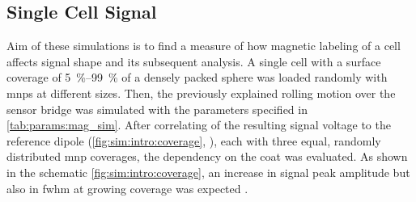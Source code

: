 \subsection{Single Cell Signal}
Aim of these simulations is to find a measure of how magnetic labeling of a cell affects signal shape and its subsequent analysis. A single cell with a surface coverage of \SIrange{5}{99}{\percent} of a densely packed sphere was loaded randomly with \glspl{mnp} at different sizes. Then, the previously explained rolling motion over the sensor bridge was simulated with the parameters specified in \cref{tab:params:mag_sim}. After correlating of the resulting signal voltage to the reference dipole (\cref{fig:sim:intro:coverage}, \blueCircle), each with three equal, randomly distributed \gls{mnp} coverages, the dependency on the coat was evaluated. As shown in the schematic \cref{fig:sim:intro:coverage}, an increase in signal peak amplitude but also in \gls{fwhm} at growing coverage was expected . 
\begin{figure}[ht!]
	\centering
	\begin{minipage}[t]{.24\linewidth}
	\end{minipage}%
	\hfill
	\begin{minipage}[b]{.7\linewidth}
		\addtocounter{subfigure}{-1}
		\\
		\vspace{\baselineskip}	
		\addtocounter{subfigure}{-1}
	\end{minipage}%
	\label{fig:sim:intro}	
\end{figure}

